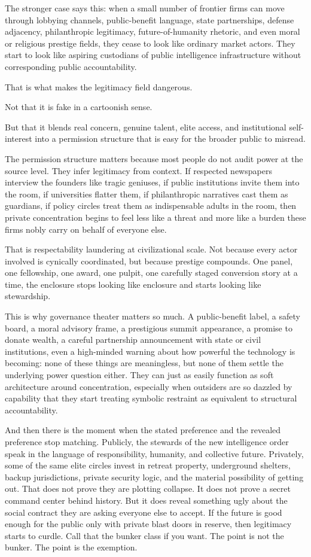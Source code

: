 \documentclass[
  american,
  12pt,
  letterpaper,
]{article}
\begin{document}
The stronger case says this: when a small number of frontier firms can
move through lobbying channels, public-benefit language, state
partnerships, defense adjacency, philanthropic legitimacy,
future-of-humanity rhetoric, and even moral or religious prestige
fields, they cease to look like ordinary market actors. They start to
look like aspiring custodians of public intelligence infrastructure
without corresponding public accountability.

That is what makes the legitimacy field dangerous.

Not that it is fake in a cartoonish sense.

But that it blends real concern, genuine talent, elite access, and
institutional self-interest into a permission structure that is easy for
the broader public to misread.

The permission structure matters because most people do not audit power
at the source level. They infer legitimacy from context. If respected
newspapers interview the founders like tragic geniuses, if public
institutions invite them into the room, if universities flatter them, if
philanthropic narratives cast them as guardians, if policy circles treat
them as indispensable adults in the room, then private concentration
begins to feel less like a threat and more like a burden these firms
nobly carry on behalf of everyone else.

That is respectability laundering at civilizational scale. Not because
every actor involved is cynically coordinated, but because prestige
compounds. One panel, one fellowship, one award, one pulpit, one
carefully staged conversion story at a time, the enclosure stops looking
like enclosure and starts looking like stewardship.

This is why governance theater matters so much. A public-benefit label,
a safety board, a moral advisory frame, a prestigious summit appearance,
a promise to donate wealth, a careful partnership announcement with
state or civil institutions, even a high-minded warning about how
powerful the technology is becoming: none of these things are
meaningless, but none of them settle the underlying power question
either. They can just as easily function as soft architecture around
concentration, especially when outsiders are so dazzled by capability
that they start treating symbolic restraint as equivalent to structural
accountability.

And then there is the moment when the stated preference and the revealed
preference stop matching. Publicly, the stewards of the new intelligence
order speak in the language of responsibility, humanity, and collective
future. Privately, some of the same elite circles invest in retreat
property, underground shelters, backup jurisdictions, private security
logic, and the material possibility of getting out. That does not prove
they are plotting collapse. It does not prove a secret command center
behind history. But it does reveal something ugly about the social
contract they are asking everyone else to accept. If the future is good
enough for the public only with private blast doors in reserve, then
legitimacy starts to curdle. Call that the bunker class if you want. The
point is not the bunker. The point is the exemption.
\end{document}
